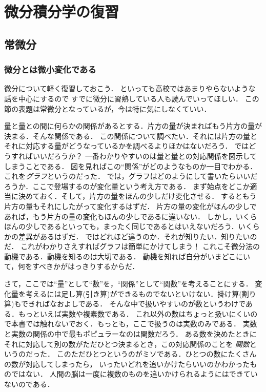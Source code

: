 \chapter{微分積分学の復習}
\section{常微分} %
\subsection{微分とは微小変化である}
微分について軽く復習しておこう．
といっても高校ではあまりやらないような話を中心にするので
すでに微分に習熟している人も読んでいってほしい．
この節の表題は常微分となっているが，今は特に気にしなくていい．

量と量との間に何らかの関係があるとする．片方の量が決まればもう片方の量が決まる．そんな関係である．
この関係について調べたい．それには片方の量とそれに対応する量がどうなっているかを調べるよりほかはないだろう．
ではどうすればいいだろうか？ 一番わかりやすいのは量と量との対応関係を図示してしまうことである．
図を見ればこの``関係''がどのようなものか一目でわかる．これを\emph{グラフ}というのだった．
では，グラフはどのようにして書いたらいいだろうか．ここで登場するのが変化量という考え方である．
まず始点をどこか適当に決めておく．そして，片方の量をほんの少しだけ変化させる．
するともう片方の量もそれにしたがって変化するはずだ．
片方の量の変化がほんの少しであれば，もう片方の量の変化もほんの少しであるに違いない．
しかし，いくらほんの少しであるといっても，まったく同じであるとはいえないだろう．いくらかの差異があるはずだ．
ではどれほど違うのか．それが知りたい．知りたいのだ．
これがわかりさえすればグラフは簡単にかけてしまう！ これこそ微分法の動機である．動機を知るのは大切である．
 動機を知れば自分がいまどこにいて，何をすべきかがはっきりするからだ．

さて，ここでは``量''として``数''を，``関係''として``関数''を考えることにする．
変化量を考えるには足し算(引き算)ができるものでないといけない．掛け算(割り算)もできればなおよしである．
そんな中で扱いやすいのが数というわけである．もっといえば実数や複素数である．
これ以外の数はちょっと扱いにくいので本書では触れないでおく．もっとも，ここで扱うのは実数のみである．
実数と実数の関係の中で最もポピュラーなのは関数だろう．
ある数を決めたときにそれに対応して別の数がただひとつ決まるとき，この対応関係のことを
\emph{関数}というのだった．
このただひとつというのがミソである．ひとつの数にたくさんの数が対応してしまったら，
いったいどれを追いかけたらいいのかわかったものではない．
人間の脳は一度に複数のものを追いかけられるようにはできていないのである．

